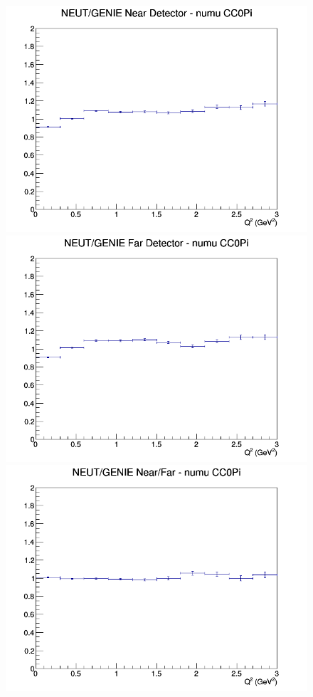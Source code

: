 \begin{figure}[h]
\endminipage
\newline
{}
\includegraphics[width=\linewidth]{Q2/nominal/ratios/CC0Pi_NEUT_GENIE_numu_near_Q2.png}
\endminipage
{}
\includegraphics[width=\linewidth]{Q2/nominal/ratios/CC0Pi_NEUT_GENIE_numu_far_Q2.png}
\endminipage
{}
\includegraphics[width=\linewidth]{Q2/nominal/ratios/CC0Pi_NEUT_GENIE_numu_NF_Q2.png}

\end{figure}
